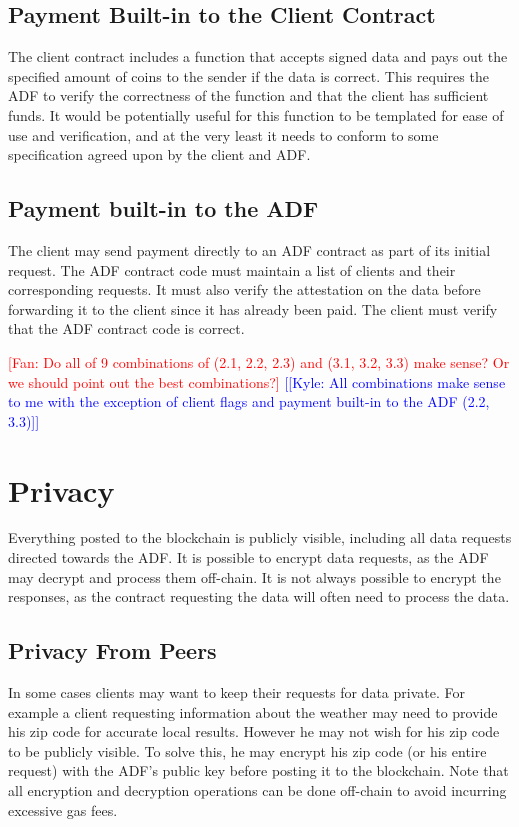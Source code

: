 \documentclass{article}
\newcommand{\kyle}[1]{\textcolor{blue}{[[\textsf{Kyle:  #1}]]}}
\newcommand{\fan}[1]{\textcolor{red}{[\textsf{Fan:  #1}]}}
\begin{document}
\subsection{Payment Built-in to the Client Contract}
    The client contract includes a function that accepts signed data and pays out the specified amount of coins to the sender if the data is correct.  This requires the ADF to verify the correctness of the function and that the client has sufficient funds.  It would be potentially useful for this function to be templated for ease of use and verification, and at the very least it needs to conform to some specification agreed upon by the client and ADF. 
    
\subsection{Payment built-in to the ADF}
    The client may send payment directly to an ADF contract as part of its initial request.  The ADF contract code must maintain a list of clients and their corresponding requests.  It must also verify the attestation on the data before forwarding it to the client since it has already been paid.  The client must verify that the ADF contract code is correct.
    
\fan{Do all of 9 combinations of (2.1, 2.2, 2.3) and (3.1, 3.2, 3.3) make sense? Or we should point out the best combinations?}
\kyle{All combinations make sense to me with the exception of client flags and payment built-in to the ADF (2.2, 3.3)}
    
\section{Privacy}
Everything posted to the blockchain is publicly visible, including all data requests directed towards the ADF.  It is possible to encrypt data requests, as the ADF may decrypt and process them off-chain.  It is not always possible to encrypt the responses, as the contract requesting the data will often need to process the data.

\subsection{Privacy From Peers}
    In some cases clients may want to keep their requests for data private.  For example a client requesting information about the weather may need to provide his zip code for accurate local results.  However he may not wish for his zip code to be publicly visible.  To solve this, he may encrypt his zip code (or his entire request) with the ADF's public key before posting it to the blockchain.  Note that all encryption and decryption operations can be done off-chain to avoid incurring excessive gas fees.\\
\end{document}
